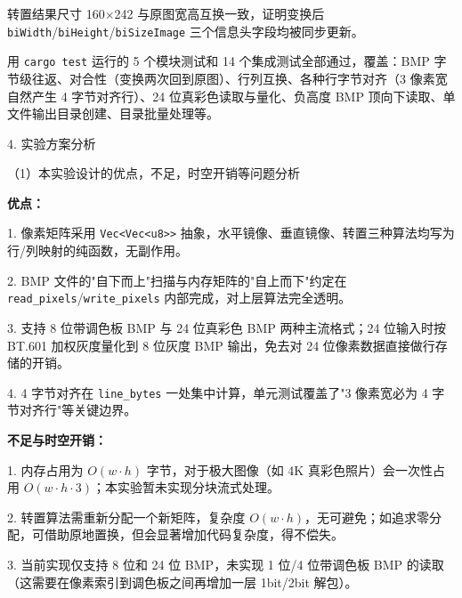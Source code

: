\noindent\hspace*{2em}转置结果尺寸 160$\times$242 与原图宽高互换一致，证明变换后 \texttt{biWidth}/\texttt{biHeight}/\texttt{biSizeImage} 三个信息头字段均被同步更新。\par
\noindent\hspace*{2em}用 \texttt{cargo test} 运行的 5 个模块测试和 14 个集成测试全部通过，覆盖：BMP 字节级往返、对合性（变换两次回到原图）、行列互换、各种行字节对齐（3 像素宽自然产生 4 字节对齐行）、24 位真彩色读取与量化、负高度 BMP 顶向下读取、单文件输出目录创建、目录批量处理等。\par
\noindent\hspace*{2em}4. 实验方案分析\par
\noindent\hspace*{2em}（1）本实验设计的优点，不足，时空开销等问题分析\par
\noindent\hspace*{2em}\textbf{优点：}\par
\noindent\hspace*{2em}1. 像素矩阵采用 \texttt{Vec<Vec<u8>>} 抽象，水平镜像、垂直镜像、转置三种算法均写为行/列映射的纯函数，无副作用。\par
\noindent\hspace*{2em}2. BMP 文件的"自下而上"扫描与内存矩阵的"自上而下"约定在 \texttt{read\_pixels}/\texttt{write\_pixels} 内部完成，对上层算法完全透明。\par
\noindent\hspace*{2em}3. 支持 8 位带调色板 BMP 与 24 位真彩色 BMP 两种主流格式；24 位输入时按 BT.601 加权灰度量化到 8 位灰度 BMP 输出，免去对 24 位像素数据直接做行存储的开销。\par
\noindent\hspace*{2em}4. 4 字节对齐在 \texttt{line\_bytes} 一处集中计算，单元测试覆盖了"3 像素宽必为 4 字节对齐行"等关键边界。\par
\noindent\hspace*{2em}\textbf{不足与时空开销：}\par
\noindent\hspace*{2em}1. 内存占用为 $O(w \cdot h)$ 字节，对于极大图像（如 4K 真彩色照片）会一次性占用 $O(w \cdot h \cdot 3)$；本实验暂未实现分块流式处理。\par
\noindent\hspace*{2em}2. 转置算法需重新分配一个新矩阵，复杂度 $O(w \cdot h)$，无可避免；如追求零分配，可借助原地置换，但会显著增加代码复杂度，得不偿失。\par
\noindent\hspace*{2em}3. 当前实现仅支持 8 位和 24 位 BMP，未实现 1 位/4 位带调色板 BMP 的读取（这需要在像素索引到调色板之间再增加一层 1bit/2bit 解包）。\par

